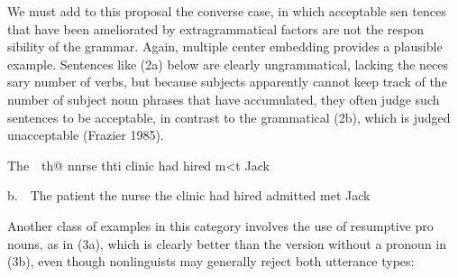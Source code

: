 \begin{styleTextbody}
We must add to this proposal the converse case, in which acceptable sen\- tences that have been ameliorated by extragrammatical factors are not the respon\- sibility of the grammar. Again, multiple center embedding provides a plausible example. Sentences like (2a) below are clearly ungrammatical, lacking the neces\- sary number of verbs, but because subjects apparently cannot keep track of the number of subject noun phrases that have accumulated, they often judge such sentences to be acceptable, in contrast to the grammatical (2b), which is judged unacceptable (Frazier 1985).
\end{styleTextbody}


\begin{styleStandard}
The\ \ th@ nnrse thti clinic had hired m{\textless}{\textquotedbl}t Jack
\end{styleStandard}


\begin{styleStandard}
b.\ \ The patient the nurse the clinic had hired admitted met Jack
\end{styleStandard}


\begin{styleTextbody}
Another class of examples in this category involves the use of resumptive pro\- nouns, as in (3a), which is clearly better than the version without a pronoun in (3b), even though nonlinguists may generally reject both utterance types:
\end{styleTextbody}



